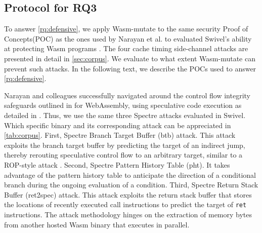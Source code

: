 \documentclass[sigplan,screen]{acmart}
\newcommand*\badge[1]{ \colorbox{red}{\color{white}#1}}
\newcommand{\tool}{Wasm-mutate\xspace}
\newcommand{\wasm}{Wasm\xspace}
\newcommand{\Wasm}{WebAssembly\xspace}
\newcommand{\todo}[1]{%
\refstepcounter{todo}
\noindent\textbf{\badge{TODO}} {\color{red}#1}
\addcontentsline{td}{todo}
{\color{red}\thesection.\thetodo\xspace #1}}
\begin{document}
\subsection{Protocol for RQ3}
\label{protocol:rq3}

\newcommand{\poct}{\emph{Cache timing POC}\xspace}
\newcommand{\pocd}{\emph{Differential computing POC}\xspace}
\newcommand{\pocp}{\emph{Port contention POC}\xspace}

To answer \ref{rq:defensive}, we apply \tool to the same security Proof of Concepts(POC) 
as the ones used by Narayan et al. to evaluated Swivel's ability at protecting \wasm programs \cite{Swivel}. 
The four cache timing side-channel attacks are presented in detail in \autoref{sec:corpus}. 
We evaluate to what extent \tool can prevent such attacks.
In the following text, we describe the POCs used to answer \ref{rq:defensive}.


Narayan and colleagues successfully navigated around the control flow integrity safeguards outlined in \cite{Swivel} for \Wasm, using speculative code execution as detailed in \cite{Spectre}. 
Thus, we use the same three Spectre attacks evaluated in Swivel.
Which specific binary and its corresponding attack can be appreciated in \autoref{tab:corpus}.
First, Spectre Branch Target Buffer (btb) attack. 
This attack exploits the branch target buffer by predicting the target of an indirect jump, thereby rerouting speculative control flow to an arbitrary target, similar to a ROP-style attack \cite{?}.
Second, Spectre Pattern History Table (pht).
It takes advantage of the pattern history table to anticipate the direction of a conditional branch during the ongoing evaluation of a condition. 
Third, Spectre Return Stack Buffer (ret2spec) attack. 
This attack exploits the return stack buffer that stores the locations of recently executed call instructions to predict the target of \texttt{ret} instructions. 
The attack methodology hinges on the extraction of memory bytes from another hosted \wasm binary that executes in parallel.

\end{document}
